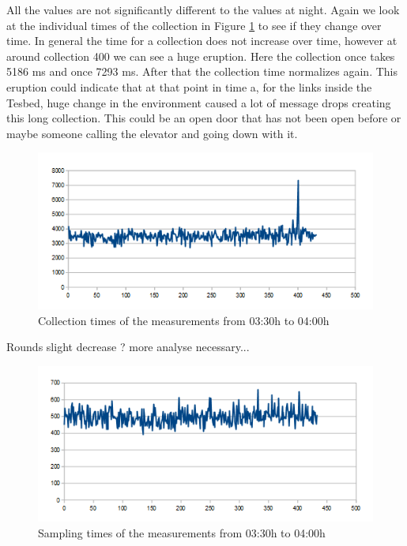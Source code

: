 All the values are not significantly different to the values at night. Again we look at the individual times of the collection in Figure \ref{fig:dayC} to see if they change over time. In general the time for a collection does not increase over time, however at around collection 400 we can see a huge eruption. Here the collection once takes 5186 ms and once 7293 ms. After that the collection time normalizes again. This eruption could indicate that at that point in time a, for the links inside the Tesbed, huge change in the environment caused a lot of message drops creating this long collection. This could be an open door that has not been open before or maybe someone calling the elevator and going down with it. 


\begin{figure}[htbp]
	\centering         
    \includegraphics[scale=0.75]{content/images/Experiment/DayCollection}
    \caption{Collection times of the measurements from 03:30h to 04:00h}
	\label{fig:dayC}
\end{figure}

Rounds slight decrease ? more analyse necessary...

\begin{figure}[tbp]
	\centering
    \includegraphics[scale=0.75]{content/images/Experiment/DayRounds}
   	\caption{Sampling times of the measurements from 03:30h to 04:00h}
    \label{fig:DayR}
\end{figure}
    

